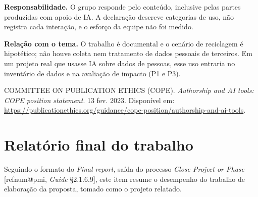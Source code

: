 \documentclass[11pt,a4paper]{article}
\makeatletter
\newcommand{\refnum}[1]{\csname refnum@#1\endcsname}
\makeatother
\begin{document}
\textbf{Responsabilidade.} O grupo responde pelo conteúdo, inclusive pelas partes produzidas com apoio de IA. A declaração descreve categorias de uso, não registra cada interação, e o esforço da equipe não foi medido.

\textbf{Relação com o tema.} O trabalho é documental e o cenário de reciclagem é hipotético; não houve coleta nem tratamento de dados pessoais de terceiros. Em um projeto real que usasse IA sobre dados de pessoas, esse uso entraria no inventário de dados e na avaliação de impacto (P1 e P3).

\begingroup\small\noindent COMMITTEE ON PUBLICATION ETHICS (COPE). \textit{Authorship and AI tools: COPE position statement}. 13 fev. 2023. Disponível em: \url{https://publicationethics.org/guidance/cope-position/authorship-and-ai-tools}.\par\endgroup
\fi

\section{Relatório final do trabalho}

Seguindo o formato do \textit{Final report}, saída do processo \textit{Close Project or Phase} [\refnum{pmi}, \textit{Guide} §2.1.6.9], este item resume o desempenho do trabalho de elaboração da proposta, tomado como o projeto relatado.
\end{document}
